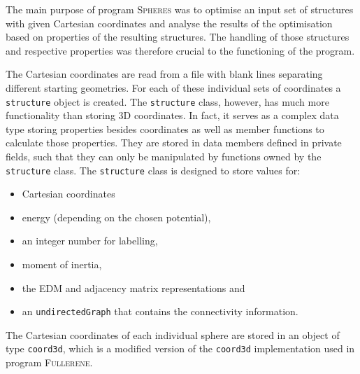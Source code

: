 The main purpose of program \textsc{Spheres} was to optimise an input set of
structures with given Cartesian coordinates and analyse the results of the
optimisation based on properties of the resulting structures. The handling of
those structures and respective properties was therefore crucial to the
functioning of the program.

The Cartesian coordinates are read from a file with blank lines separating
different starting geometries. For each of these individual sets of coordinates
a \verb|structure| object is created. The \verb|structure| class, however, has
much more functionality than storing 3D coordinates. In fact, it serves as a
complex data type storing properties besides coordinates as well as member
functions to calculate those properties. They are stored in data members defined
in private fields, such that they can only be manipulated by functions owned by
the \verb|structure| class. The \verb|structure| class is designed to store
values for:
\begin{itemize}
    \item Cartesian coordinates
    \item energy (depending on the chosen potential), 
    \item an integer number for labelling, 
    \item moment of inertia, 
    \item the \ac{EDM} and adjacency matrix representations and
    \item an \verb|undirectedGraph| that contains the connectivity information.
\end{itemize}

The Cartesian coordinates of each individual sphere are stored in an object of
type \texttt{coord3d}, which is a modified version of the \verb|coord3d|
implementation used in program
\textsc{Fullerene}.\autocite{Schwerdtfeger_Programfullerenesoftware_2013} 


